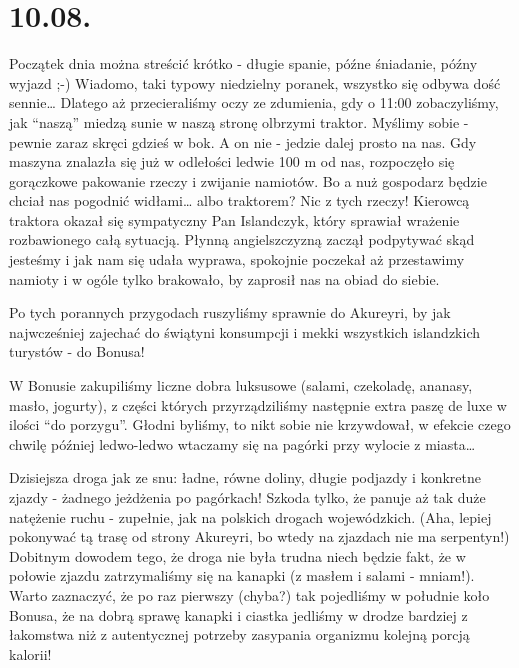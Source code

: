 \chapter{10.08.}

Początek dnia można streścić krótko - długie spanie, późne śniadanie, późny wyjazd ;-) Wiadomo, taki typowy niedzielny poranek, wszystko się odbywa dość sennie… Dlatego aż przecieraliśmy oczy ze zdumienia, gdy o 11:00 zobaczyliśmy, jak “naszą” miedzą sunie w naszą stronę olbrzymi traktor. Myślimy sobie - pewnie zaraz skręci gdzieś w bok. A on nie - jedzie dalej prosto na nas. Gdy maszyna znalazła się już w odlełości ledwie 100 m od nas, rozpoczęło się gorączkowe pakowanie rzeczy i zwijanie namiotów. Bo a nuż gospodarz będzie chciał nas pogodnić widłami… albo traktorem? Nic z tych rzeczy! Kierowcą traktora okazał się sympatyczny Pan Islandczyk, który sprawiał wrażenie rozbawionego całą sytuacją. Płynną angielszczyzną zaczął podpytywać skąd jesteśmy i jak nam się udała wyprawa, spokojnie poczekał aż przestawimy namioty i w ogóle tylko brakowało, by zaprosił nas na obiad do siebie.

Po tych porannych przygodach ruszyliśmy sprawnie do Akureyri, by jak najwcześniej zajechać do świątyni konsumpcji i mekki wszystkich islandzkich turystów - do Bonusa!


W Bonusie zakupiliśmy liczne dobra luksusowe (salami, czekoladę, ananasy, masło, jogurty), z części których przyrządziliśmy następnie extra paszę de luxe w ilości “do porzygu”. Głodni byliśmy, to nikt sobie nie krzywdował, w efekcie czego chwilę później ledwo-ledwo wtaczamy się na pagórki przy wylocie z miasta…


Dzisiejsza droga jak ze snu: ładne, równe doliny, długie podjazdy i konkretne zjazdy - żadnego jeżdżenia po pagórkach! Szkoda tylko, że panuje aż tak duże natężenie ruchu - zupełnie, jak na polskich drogach wojewódzkich. (Aha, lepiej pokonywać tą trasę od strony Akureyri, bo wtedy na zjazdach nie ma serpentyn!) Dobitnym dowodem tego, że droga nie była trudna niech będzie fakt, że w połowie zjazdu zatrzymaliśmy się na kanapki (z masłem i salami - mniam!). Warto zaznaczyć, że po raz pierwszy (chyba?) tak pojedliśmy w południe koło Bonusa, że na dobrą sprawę kanapki i ciastka jedliśmy w drodze bardziej z łakomstwa niż z autentycznej potrzeby zasypania organizmu kolejną porcją kalorii!

